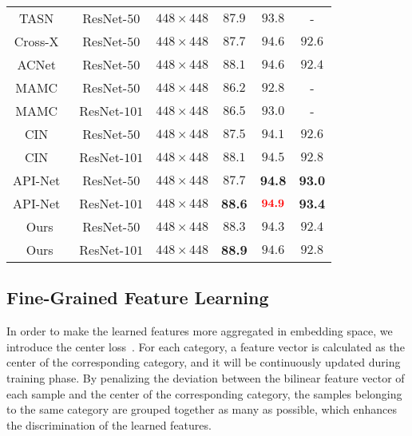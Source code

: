 \documentclass[conference]{IEEEtran}
\begin{document}
\begin{table*}[ht]
\begin{center}
\begin{tabular}{c|c|c|c|c|c}
      TASN~\cite{Zheng_2019_CVPR} & ResNet-$50$ & $448 \times 448$ & $87.9$ & $93.8$ & - \\
      Cross-X~\cite{luo2019cross} & ResNet-$50$ & $448 \times 448$ & $87.7$ & $94.6$ & $92.6$ \\
      ACNet~\cite{2019ACNet} & ResNet-$50$ & $448 \times 448$ & $88.1$ & $94.6$ & $92.4$ \\
    \hline
        MAMC~\cite{sun2018multi} & ResNet-$50$ & $448 \times 448$ & $86.2$ & $92.8$ & - \\
    MAMC~\cite{sun2018multi} & ResNet-$101$ & $448 \times 448$ & $86.5$ & $93.0$ & - \\
    \hline
      CIN~\cite{2020CIN} & ResNet-$50$ & $448 \times 448$ & $87.5$ & $94.1$ & $92.6$ \\
        CIN~\cite{2020CIN} & ResNet-$101$ & $448 \times 448$ & $88.1$ & $94.5$ & $92.8$ \\
    \hline
      API-Net~\cite{zhuang2020learning} & ResNet-$50$ & $448 \times 448$ & $87.7$ & \textcolor[RGB]{0,0,255}{\textbf{94.8}} & \textcolor[RGB]{0,0,255}{\textbf{93.0}} \\
      API-Net~\cite{zhuang2020learning} & ResNet-$101$ & $448 \times 448$ & \textcolor[RGB]{0,0,255}{\textbf{88.6}} & $\textcolor[RGB]{255,0,0}{\textbf{94.9}}$ & \textcolor[RGB]{255,0,0}{\textbf{93.4}} \\
  \hline
      Ours & ResNet-$50$ & $448 \times 448$ & $88.3$ & $94.3$ & $92.4$ \\
    Ours & ResNet-$101$ & $448 \times 448$ & \textcolor[RGB]{255,0,0}{\textbf{88.9}} & $94.6$ & $92.8$ \\
  \hline
\end{tabular}
\end{center}
\end{table*}


\subsection{Fine-Grained Feature Learning}
In order to make the learned features more aggregated in embedding space, we introduce the center loss~\cite{wen2016discriminative}. For each category, a feature vector is calculated as the center of the corresponding category, and it will be continuously updated during training phase. By penalizing the deviation between the bilinear feature vector of each sample and the center of the corresponding category, the samples belonging to the same category are grouped together as many as possible, which enhances the discrimination of the learned features.
\end{document}
